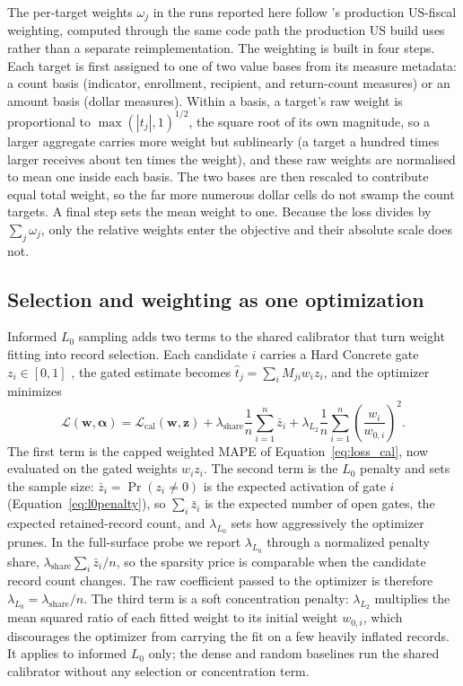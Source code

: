 The per-target weights $\omega_j$ in the runs reported here follow \populace{}'s production US-fiscal
weighting, computed through the same code path the production US build uses rather than a separate
reimplementation. The weighting is built in four steps. Each target is first assigned to one of two
value bases from its measure metadata: a count basis (indicator, enrollment, recipient, and
return-count measures) or an amount basis (dollar measures). Within a basis, a target's raw
weight is proportional to $\max(|t_j|, 1)^{1/2}$, the square root of its own magnitude, so a larger
aggregate carries more weight but sublinearly (a target a hundred times larger receives about ten times
the weight), and these raw weights are normalised to mean one inside each basis. The two bases are then
rescaled to contribute equal total weight, so the far more numerous dollar cells do not swamp the count
targets. A final step sets the mean weight to one. Because the loss divides by $\sum_j \omega_j$, only
the relative weights enter the objective and their absolute scale does not.

\subsection{Selection and weighting as one optimization}

Informed $L_0$ sampling adds two terms to the shared calibrator that turn weight fitting into record
selection. Each candidate $i$ carries a Hard Concrete gate $z_i \in [0, 1]$ \citep{louizos2018}, the
gated estimate becomes $\hat{t}_j = \sum_i M_{ji} w_i z_i$, and the optimizer minimizes
\begin{equation}
    \mathcal{L}(\mathbf{w}, \boldsymbol{\alpha}) =
    \mathcal{L}_{\mathrm{cal}}(\mathbf{w}, \mathbf{z}) +
    \lambda_{\mathrm{share}}\frac{1}{n}\sum_{i=1}^{n} \bar{z}_i +
    \lambda_{L_2} \frac{1}{n} \sum_{i=1}^{n} \left(\frac{w_i}{w_{0,i}}\right)^2.
    \label{eq:loss}
\end{equation}
The first term is the capped weighted MAPE of Equation~\ref{eq:loss_cal}, now evaluated on the gated
weights $w_i z_i$. The second term is the $L_0$ penalty and sets the sample size: $\bar{z}_i = \Pr(z_i \neq 0)$ is the
expected activation of gate $i$ (Equation~\ref{eq:l0penalty}), so $\sum_i \bar{z}_i$ is the expected number of open gates, the
expected retained-record count, and $\lambda_{L_0}$ sets how aggressively the optimizer prunes. In the
full-surface probe we report $\lambda_{L_0}$ through a normalized penalty share,
$\lambda_{\mathrm{share}}\sum_i\bar{z}_i/n$, so the sparsity price is comparable when the candidate
record count changes. The raw coefficient passed to the optimizer is therefore
$\lambda_{L_0}=\lambda_{\mathrm{share}}/n$. The third term is a soft concentration penalty: $\lambda_{L_2}$ multiplies the mean squared ratio of each
fitted weight to its initial weight $w_{0,i}$, which discourages the optimizer from carrying the fit on
a few heavily inflated records. It applies to informed $L_0$ only; the dense and random baselines run the
shared calibrator without any selection or concentration term.

